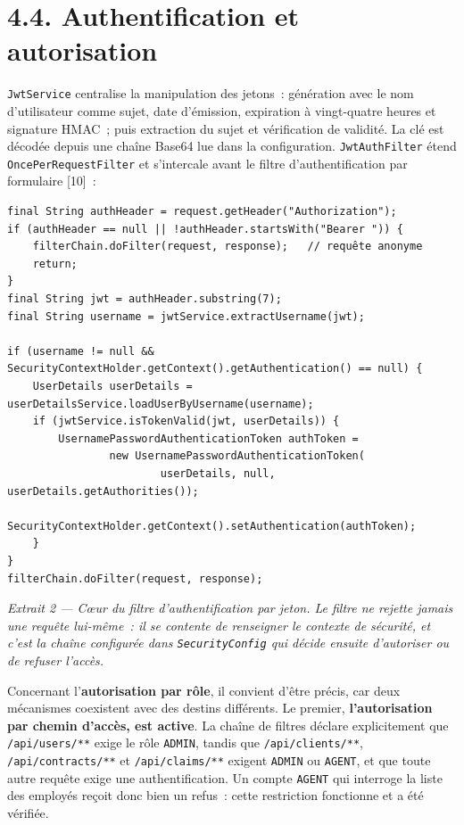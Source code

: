 \documentclass[12pt,a4paper]{report}
\begin{document}
\section*{4.4. Authentification et autorisation}
\texttt{JwtService} centralise la manipulation des jetons~: génération avec le nom d'utilisateur comme sujet, date d'émission, expiration à vingt-quatre heures et signature HMAC~; puis extraction du sujet et vérification de validité. La clé est décodée depuis une chaîne Base64 lue dans la configuration.
\texttt{JwtAuthFilter} étend \texttt{OncePerRequestFilter} et s'intercale avant le filtre d'authentification par formulaire [10]~:
\begin{verbatim}
final String authHeader = request.getHeader("Authorization");
if (authHeader == null || !authHeader.startsWith("Bearer ")) {
    filterChain.doFilter(request, response);   // requête anonyme
    return;
}
final String jwt = authHeader.substring(7);
final String username = jwtService.extractUsername(jwt);

if (username != null && SecurityContextHolder.getContext().getAuthentication() == null) {
    UserDetails userDetails = userDetailsService.loadUserByUsername(username);
    if (jwtService.isTokenValid(jwt, userDetails)) {
        UsernamePasswordAuthenticationToken authToken =
                new UsernamePasswordAuthenticationToken(
                        userDetails, null, userDetails.getAuthorities());
        SecurityContextHolder.getContext().setAuthentication(authToken);
    }
}
filterChain.doFilter(request, response);
\end{verbatim}
\begin{center}\textit{Extrait 2 — Cœur du filtre d'authentification par jeton. Le filtre ne rejette jamais une requête lui-même~: il se contente de renseigner le contexte de sécurité, et c'est la chaîne configurée dans \texttt{SecurityConfig} qui décide ensuite d'autoriser ou de refuser l'accès.}\end{center}
Concernant l'\textbf{autorisation par rôle}, il convient d'être précis, car deux mécanismes coexistent avec des destins différents.
Le premier, \textbf{l'autorisation par chemin d'accès, est active}. La chaîne de filtres déclare explicitement que \texttt{/api/users/**} exige le rôle \texttt{ADMIN}, tandis que \texttt{/api/clients/**}, \texttt{/api/contracts/**} et \texttt{/api/claims/**} exigent \texttt{ADMIN} ou \texttt{AGENT}, et que toute autre requête exige une authentification. Un compte \texttt{AGENT} qui interroge la liste des employés reçoit donc bien un refus~: cette restriction fonctionne et a été vérifiée.
\end{document}
